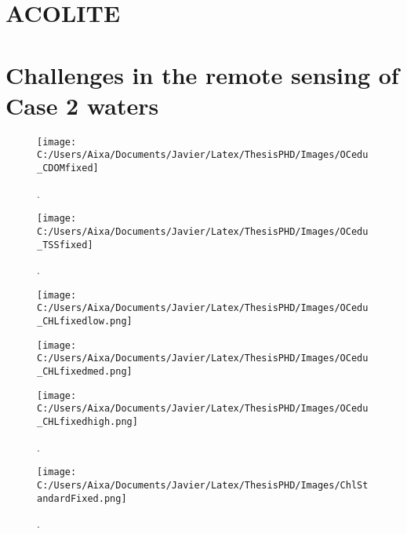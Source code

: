 \section{ACOLITE}
\label{subsec:acolite}




\section{Challenges in the remote sensing of Case 2 waters}

\begin{figure}[htb]
\centering
      \texttt{[image: C:/Users/Aixa/Documents/Javier/Latex/ThesisPHD/Images/OCedu\_CDOMfixed]}
      \caption{.\label{fig:CDOMfixed} } 
\end{figure}

\begin{figure}[htb]
\centering
      \texttt{[image: C:/Users/Aixa/Documents/Javier/Latex/ThesisPHD/Images/OCedu\_TSSfixed]}
      \caption{.\label{fig:TSSfixed} } 
\end{figure}

\begin{figure}[htb]
  \begin{minipage}[c]{0.48\linewidth}
    \centering
      \texttt{[image: C:/Users/Aixa/Documents/Javier/Latex/ThesisPHD/Images/OCedu\_CHLfixedlow.png]}
    \end{minipage}
   \hfill   
   \begin{minipage}[c]{0.48\linewidth}
    \centering
      \texttt{[image: C:/Users/Aixa/Documents/Javier/Latex/ThesisPHD/Images/OCedu\_CHLfixedmed.png]}
  \end{minipage}    
  \begin{minipage}[c]{1.0\linewidth}
    \centering
      \texttt{[image: C:/Users/Aixa/Documents/Javier/Latex/ThesisPHD/Images/OCedu\_CHLfixedhigh.png]}
  \end{minipage}    
      \caption{.\label{fig:OCedu_CHLfixed} }
\end{figure}

\begin{figure}[htb]
\centering
      \texttt{[image: C:/Users/Aixa/Documents/Javier/Latex/ThesisPHD/Images/ChlStandardFixed.png]}
      \caption{.\label{fig:ChlStandardFixed} } 
\end{figure}

